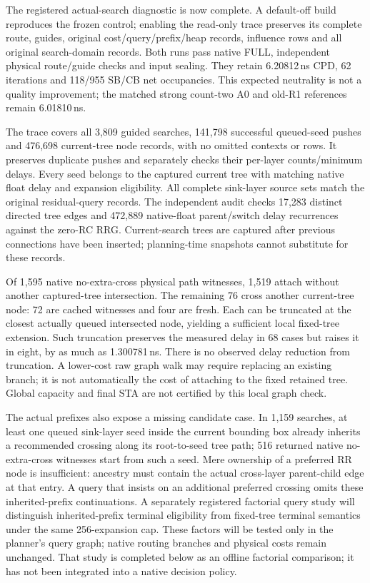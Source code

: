 The registered actual-search diagnostic is now complete. A default-off build reproduces the frozen control; enabling the read-only trace preserves its complete route, guides, original cost/query/prefix/heap records, influence rows and all original search-domain records. Both runs pass native FULL, independent physical route/guide checks and input sealing. They retain 6.20812\,ns CPD, 62 iterations and 118/955 SB/CB net occupancies. This expected neutrality is not a quality improvement; the matched strong count-two A0 and old-R1 references remain 6.01810\,ns.

The trace covers all 3,809 guided searches, 141,798 successful queued-seed pushes and 476,698 current-tree node records, with no omitted contexts or rows. It preserves duplicate pushes and separately checks their per-layer counts/minimum delays. Every seed belongs to the captured current tree with matching native float delay and expansion eligibility. All complete sink-layer source sets match the original residual-query records. The independent audit checks 17,283 distinct directed tree edges and 472,889 native-float parent/switch delay recurrences against the zero-RC RRG. Current-search trees are captured after previous connections have been inserted; planning-time snapshots cannot substitute for these records.

Of 1,595 native no-extra-cross physical path witnesses, 1,519 attach without another captured-tree intersection. The remaining 76 cross another current-tree node: 72 are cached witnesses and four are fresh. Each can be truncated at the closest actually queued intersected node, yielding a sufficient local fixed-tree extension. Such truncation preserves the measured delay in 68 cases but raises it in eight, by as much as 1.300781\,ns. There is no observed delay reduction from truncation. A lower-cost raw graph walk may require replacing an existing branch; it is not automatically the cost of attaching to the fixed retained tree. Global capacity and final STA are not certified by this local graph check.

The actual prefixes also expose a missing candidate case. In 1,159 searches, at least one queued sink-layer seed inside the current bounding box already inherits a recommended crossing along its root-to-seed tree path; 516 returned native no-extra-cross witnesses start from such a seed. Mere ownership of a preferred RR node is insufficient: ancestry must contain the actual cross-layer parent-child edge at that entry. A query that insists on an additional preferred crossing omits these inherited-prefix continuations. A separately registered factorial query study will distinguish inherited-prefix terminal eligibility from fixed-tree terminal semantics under the same 256-expansion cap. These factors will be tested only in the planner's query graph; native routing branches and physical costs remain unchanged. That study is completed below as an offline factorial comparison; it has not been integrated into a native decision policy.

